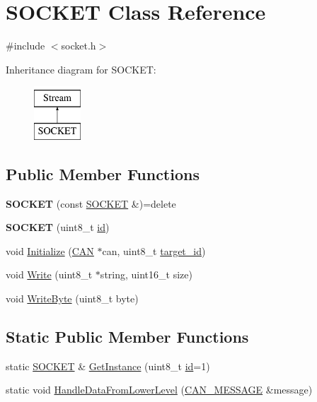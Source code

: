\hypertarget{class_s_o_c_k_e_t}{}\section{S\+O\+C\+K\+ET Class Reference}
\label{class_s_o_c_k_e_t}


{\ttfamily \#include $<$socket.\+h$>$}

Inheritance diagram for S\+O\+C\+K\+ET\+:\begin{figure}[H]
\begin{center}
\leavevmode
\includegraphics[height=2.000000cm]{class_s_o_c_k_e_t}
\end{center}
\end{figure}
\subsection*{Public Member Functions}
\begin{DoxyCompactItemize}
\item 
{\bfseries S\+O\+C\+K\+ET} (const \hyperlink{class_s_o_c_k_e_t}{S\+O\+C\+K\+ET} \&)=delete\hypertarget{class_s_o_c_k_e_t_a354625580716401ca8444fd01b99e89e}{}\label{class_s_o_c_k_e_t_a354625580716401ca8444fd01b99e89e}

\item 
{\bfseries S\+O\+C\+K\+ET} (uint8\+\_\+t \hyperlink{class_s_o_c_k_e_t_a0755fe74751c2d94d3d1679cad9e6544}{id})\hypertarget{class_s_o_c_k_e_t_ab87e109918e43ba097c153114f4f6494}{}\label{class_s_o_c_k_e_t_ab87e109918e43ba097c153114f4f6494}

\item 
void \hyperlink{class_s_o_c_k_e_t_a883fe771ed7afbc3373d1a7a8bb363ba}{Initialize} (\hyperlink{class_c_a_n}{C\+AN} $\ast$can, uint8\+\_\+t \hyperlink{class_s_o_c_k_e_t_a566ef7ae1ca5366f622bbe805954a031}{target\+\_\+id})
\item 
void \hyperlink{class_s_o_c_k_e_t_ad8ee6b81c9f30267406412a95264abed}{Write} (uint8\+\_\+t $\ast$string, uint16\+\_\+t size)
\item 
void \hyperlink{class_s_o_c_k_e_t_abcddb460b7adf3595a813f08f3659356}{Write\+Byte} (uint8\+\_\+t byte)
\end{DoxyCompactItemize}
\subsection*{Static Public Member Functions}
\begin{DoxyCompactItemize}
\item 
static \hyperlink{class_s_o_c_k_e_t}{S\+O\+C\+K\+ET} \& \hyperlink{class_s_o_c_k_e_t_affb9b8540e07a471a1e48c0e4f595831}{Get\+Instance} (uint8\+\_\+t \hyperlink{class_s_o_c_k_e_t_a0755fe74751c2d94d3d1679cad9e6544}{id}=1)
\item 
static void \hyperlink{class_s_o_c_k_e_t_ab1345aded87c899fd525616b6f2cca4a}{Handle\+Data\+From\+Lower\+Level} (\hyperlink{struct_c_a_n___m_e_s_s_a_g_e}{C\+A\+N\+\_\+\+M\+E\+S\+S\+A\+GE} \&message)
\end{DoxyCompactItemize}
